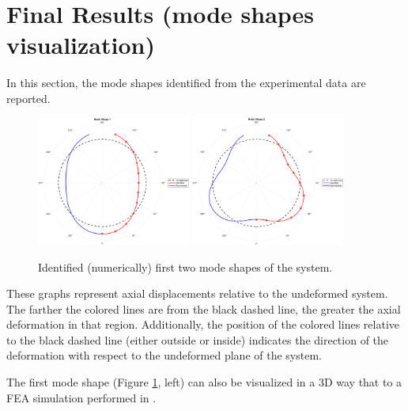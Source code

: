 \section{Final Results (mode shapes visualization)}
\label{sec:final_results_B}

In this section, the mode shapes identified from the experimental data are reported.

\begin{figure}[H]
    \centering
    \includegraphics[width=0.45\textwidth]{img/MATLAB/Part_B/ModeShape_01.png}
    \hfill
    \includegraphics[width=0.45\textwidth]{img/MATLAB/Part_B/ModeShape_02.png}
    \caption{Identified (numerically) first two mode shapes of the system.}
    \label{fig:mode_shapes}
\end{figure}

These graphs represent axial displacements relative to the undeformed system.
The farther the colored lines are from the black dashed line, the greater the axial deformation in that region.
Additionally, the position of the colored lines relative to the black dashed line (either outside or inside) indicates the direction of the deformation with respect to the undeformed plane of the system.

The first mode shape (Figure \ref{fig:mode_shapes}, left) can also be visualized in a 3D way that to a FEA simulation performed in \cite{FEM_rail_wheel}.

